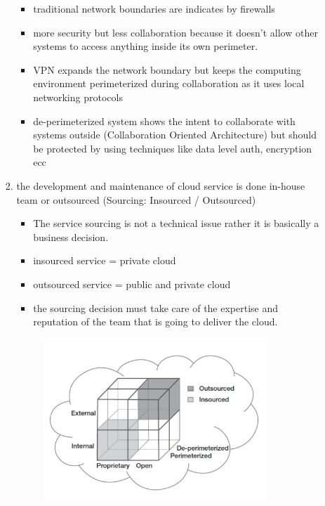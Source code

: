 \documentclass{article}
\begin{document}
\begin{itemize}
\begin{itemize}
\begin{enumerate}
            \begin{itemize}
                \item traditional network boundaries are indicates by firewalls
                \item more security but less collaboration because it doesn't allow other systems to access anything inside its own perimeter.
                \item VPN expands the network boundary but keeps the computing environment perimeterized during collaboration as it uses local networking protocols
                \item de-perimeterized system shows the intent to collaborate with systems outside (Collaboration Oriented Architecture) but should be protected by using techniques like data level auth, encryption ecc
            \end{itemize}
            \item the development and maintenance of cloud service is done in-house team or outsourced (Sourcing: Insourced / Outsourced)
            \begin{itemize}
                \item The service sourcing is not a technical issue rather it is basically a business decision.
                \item insourced service = private cloud
                \item outsourced service = public and private cloud
                \item the sourcing decision must take care of the expertise and reputation of the team that is going to deliver the cloud.
            \end{itemize}
            \begin{figure}[h]
                \centering
                \includegraphics[width=0.90\textwidth]{figure/cloud_cube_model.png}

\end{figure}
\end{enumerate}
\end{itemize}
\end{itemize}
\end{document}
